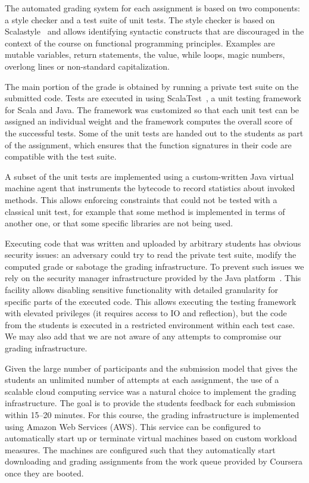 \documentclass{sig-alternate}
\begin{document}
The automated grading system for each assignment is based on two components: a
style checker and a test suite of unit tests. The style checker is based on
Scalastyle~\cite{ScalaStyle} and allows identifying syntactic constructs that
are discouraged in the context of the course on functional programming principles.
Examples are mutable variables, return statements, the \lstinline@null@ value,
while loops, magic numbers, overlong lines or non-standard capitalization.

The main portion of the grade is obtained by running a private test suite on
the submitted code. Tests are executed in using ScalaTest~\cite{scalatest}, a
unit testing framework for Scala and Java. The framework was customized so that
each unit test can be assigned an individual weight and the framework computes
the overall score of the successful tests. Some of the unit tests are handed
out to the students as part of the assignment, which ensures that the function
signatures in their code are compatible with the test suite.

A subset of the unit tests are implemented using a custom-written Java virtual
machine agent \cite{vmagents} that instruments the bytecode to record statistics about
invoked methods. This allows enforcing constraints that could not be tested with a
classical unit test, for example that some method is implemented in terms of another
one, or that some specific libraries are not being used.

Executing code that was written and uploaded by arbitrary students has obvious
security issues: an adversary could try to read the private test suite, modify
the computed grade or sabotage the grading infrastructure. To prevent such issues
we rely on the security manager infrastructure provided by the Java platform~\cite{securityManager}.
This facility allows disabling sensitive functionality with detailed granularity
for specific parts of the executed code. This allows executing the testing framework
with elevated privileges (it requires access to IO and reflection), but the code
from the students is executed in a restricted environment within each test case.
We may also add that we are not aware of any attempts to compromise our grading
infrastructure.

Given the large number of participants and the submission model that gives the
students an unlimited number of attempts at each assignment, the use of a scalable
cloud computing service was a natural choice to implement the grading infrastructure.
The goal is to provide the students feedback for each submission within 15--20
minutes. For this course, the grading infrastructure is implemented using Amazon
Web Services (AWS). This service can be configured to automatically start up or
terminate virtual machines based on custom workload measures. The machines are
configured such that they automatically start downloading and grading assignments
from the work queue provided by Coursera once they are booted.
\end{document}
